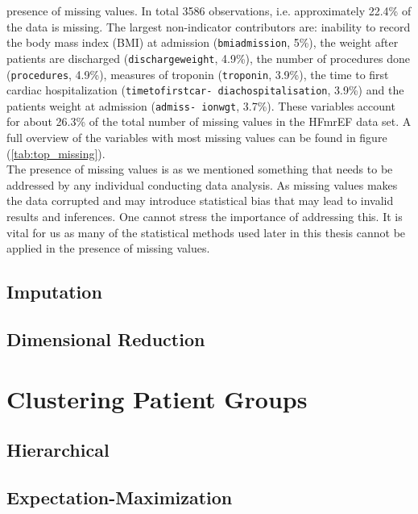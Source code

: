 \documentclass[../thesis.tex]{subfiles}
\begin{document}
\noindent presence of missing values. In total 3586 observations, i.e. approximately 22.4\% of the data is missing. The largest non-indicator contributors are: inability to record the body mass index (BMI) at admission (\texttt{bmiadmission}, 5\%), the weight after patients are discharged (\texttt{dischargeweight}, 4.9\%), the number of procedures done (\texttt{procedures}, 4.9\%), measures of troponin (\texttt{troponin}, 3.9\%), the time to first cardiac hospitalization (\texttt{timetofirstcar- diachospitalisation}, 3.9\%) and the patients weight at admission (\texttt{admiss- ionwgt}, 3.7\%). These variables account for about 26.3\% of the total number of missing values in the HFmrEF data set. A full overview of the variables with most missing values can be found in figure (\ref{tab:top_missing}).\\
\indent The presence of missing values is as we mentioned something that needs to be addressed by any individual conducting data analysis. As missing values makes the data corrupted and may introduce statistical bias that may lead to invalid results and inferences. One cannot stress the importance of addressing this. It is vital for us as many of the statistical methods used later in this thesis cannot be applied in the presence of missing values.   

\subsection{Imputation}
\label{subsec:impu}

\newpage

\subsection{Dimensional Reduction}
\label{subsec:dim_red}

\section{Clustering Patient Groups}
\label{sec:cluster_pat_gro}

\subsection{Hierarchical}
\label{subsec:hierarchical}

\subsection{Expectation-Maximization}
\label{subsec:em}
\end{document}

